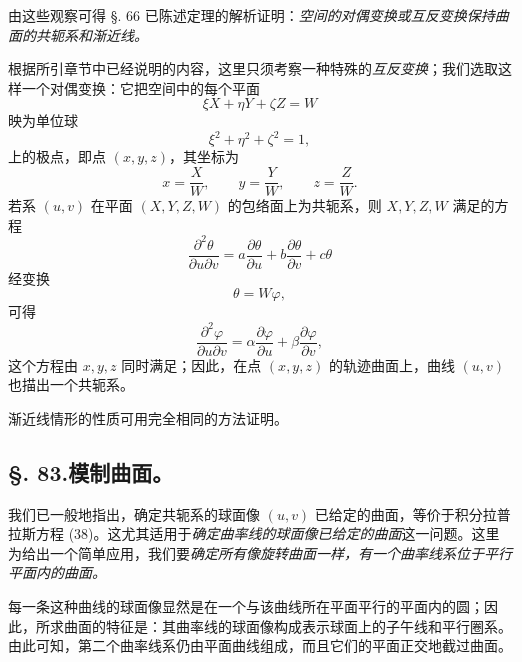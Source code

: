 由这些观察可得 \S. 66 已陈述定理的解析证明：\emph{空间的对偶变换或互反变换保持曲面的共轭系和渐近线。}

根据所引章节中已经说明的内容，这里只须考察一种特殊的\emph{互反变换}；我们选取这样一个对偶变换：它把空间中的每个平面
\[
 \xi X+\eta Y+\zeta Z=W
\]
映为单位球
\[
 \xi^2+\eta^2+\zeta^2=1,
\]
上的极点，即点 \((x,y,z)\)，其坐标为
\[
 x=\frac{X}{W},\qquad y=\frac{Y}{W},\qquad z=\frac{Z}{W}.
\]
若系 \((u,v)\) 在平面 \((X,Y,Z,W)\) 的包络面上为共轭系，则 \(X,Y,Z,W\) 满足的方程
\[
 \frac{\partial^2\theta}{\partial u\partial v}=a\frac{\partial\theta}{\partial u}+b\frac{\partial\theta}{\partial v}+c\theta
\]
经变换
\[
 \theta=W\varphi,
\]
可得
\[
 \frac{\partial^2\varphi}{\partial u\partial v}=\alpha\frac{\partial\varphi}{\partial u}+\beta\frac{\partial\varphi}{\partial v},
\]
这个方程由 \(x,y,z\) 同时满足；因此，在点 \((x,y,z)\) 的轨迹曲面上，曲线 \((u,v)\) 也描出一个共轭系。

渐近线情形的性质可用完全相同的方法证明。

\subsection*{\S. 83.\quad 模制曲面。}

我们已一般地指出，确定共轭系的球面像 \((u,v)\) 已给定的曲面，等价于积分拉普拉斯方程 (38)。这尤其适用于\emph{确定曲率线的球面像已给定的曲面}这一问题。这里为给出一个简单应用，我们要\emph{确定所有像旋转曲面一样，有一个曲率线系位于平行平面内的曲面。}

每一条这种曲线的球面像显然是在一个与该曲线所在平面平行的平面内的圆；因此，所求曲面的特征是：其曲率线的球面像构成表示球面上的子午线和平行圈系。由此可知，第二个曲率线系仍由平面曲线组成，而且它们的平面正交地截过曲面。

